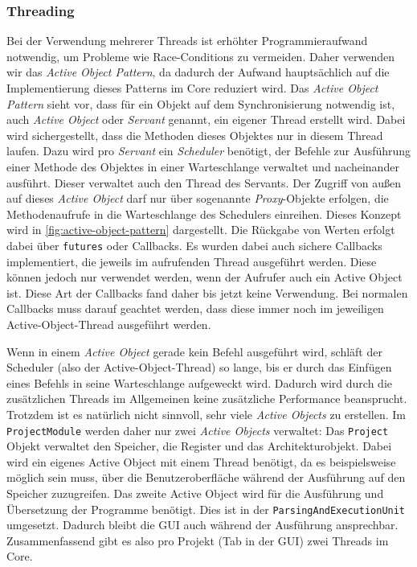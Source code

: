 \subsubsection{Threading}

Bei der Verwendung mehrerer Threads ist erhöhter Programmieraufwand
notwendig, um Probleme wie Race-Conditions zu vermeiden. Daher verwenden wir das
\emph{Active Object Pattern}, da dadurch der Aufwand hauptsächlich auf die
Implementierung dieses Patterns im Core reduziert wird. Das \emph{Active
Object Pattern} sieht vor, dass für ein Objekt auf dem Synchronisierung
notwendig ist, auch \emph{Active Object} oder \emph{Servant} genannt, ein
eigener Thread erstellt wird. Dabei wird sichergestellt, dass die Methoden
dieses Objektes nur in diesem Thread laufen. Dazu wird pro \emph{Servant} ein
\emph{Scheduler} benötigt, der Befehle zur Ausführung einer Methode des
Objektes in einer Warteschlange verwaltet und nacheinander ausführt. Dieser
verwaltet auch den Thread des Servants. Der Zugriff von außen auf dieses
\emph{Active Object} darf nur über sogenannte \emph{Proxy}-Objekte erfolgen,
die Methodenaufrufe in die Warteschlange des Schedulers einreihen. Dieses
Konzept wird in \autoref{fig:active-object-pattern} dargestellt. Die Rückgabe
von Werten erfolgt dabei über \texttt{futures} oder Callbacks. Es wurden dabei
auch sichere Callbacks implementiert, die jeweils im aufrufenden Thread
ausgeführt werden. Diese können jedoch nur verwendet werden, wenn der Aufrufer
auch ein Active Object ist. Diese Art der Callbacks fand daher bis jetzt keine
Verwendung. Bei normalen Callbacks muss darauf geachtet werden, dass diese immer
noch im jeweiligen Active-Object-Thread ausgeführt werden.

Wenn in einem \emph{Active Object} gerade kein Befehl ausgeführt wird, schläft
der Scheduler (also der Active-Object-Thread) so lange, bis er durch das
Einfügen eines Befehls in seine Warteschlange aufgeweckt wird. Dadurch wird
durch die zusätzlichen Threads im Allgemeinen keine zusätzliche Performance
beansprucht. Trotzdem ist es natürlich nicht sinnvoll, sehr viele \emph{Active
Objects} zu erstellen. Im \texttt{ProjectModule} werden daher nur zwei
\emph{Active Objects} verwaltet: Das \texttt{Project} Objekt verwaltet den
Speicher, die Register und das Architekturobjekt. Dabei wird ein eigenes Active
Object mit einem Thread benötigt, da es beispielsweise möglich sein muss, über
die Benutzeroberfläche während der Ausführung auf den Speicher zuzugreifen. Das
zweite Active Object wird für die Ausführung und Übersetzung der Programme
benötigt. Dies ist in der \texttt{ParsingAndExecutionUnit} umgesetzt. Dadurch
bleibt die GUI auch während der Ausführung ansprechbar. Zusammenfassend gibt es
also pro Projekt (Tab in der GUI) zwei Threads im Core.

